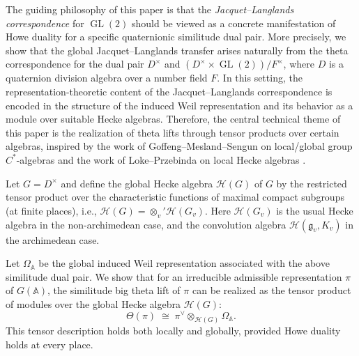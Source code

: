 \documentclass[11pt]{article}
\theoremstyle{plain}
\theoremstyle{remark}
\theoremstyle{definition}
\DeclareMathOperator{\GL}{GL}
\begin{document}
The guiding philosophy of this paper is that the \emph{Jacquet--Langlands correspondence} \cite{JL70} for $\GL(2)$ should be viewed as a concrete manifestation of Howe duality for a specific quaternionic similitude dual pair.
More precisely, we show that the global Jacquet--Langlands transfer arises naturally from the theta correspondence for the dual pair $D^{\times}$ and $(D^{\times}\times \GL(2))/F^{\times}$,
where $D$ is a quaternion division algebra over a number field $F$.
In this setting, the representation-theoretic content of the Jacquet--Langlands correspondence is encoded in the structure of the induced Weil representation and its behavior as a module over suitable Hecke algebras.
Therefore, the central technical theme of this paper is the realization of theta lifts through tensor products over certain algebras, inspired by the work of Goffeng--Mesland--Sengun on local/global group $C^*$-algebras \cite{GMS2024} and the work of Loke--Przebinda on local Hecke algebras \cite{LokePrze2024}.

Let $G=D^{\times}$ and define the global Hecke algebra $\mathcal{H}(G)$ of $G$ by the restricted tensor product over the characteristic functions of maximal compact subgroups (at finite places), i.e.,
$\mathcal{H}(G)=\otimes_v{}' \mathcal{H}(G_v)$.
Here $\mathcal{H}(G_v)$ is the usual Hecke algebra in the non-archimedean case, and the convolution algebra $\mathcal{H}(\mathfrak{g}_v,K_v)$ in the archimedean case.

Let $\Omega_{\mathbb{A}}$ be the global induced Weil representation associated with the above similitude dual pair.
We show that for an irreducible admissible representation $\pi$ of $G(\mathbb{A})$, the similitude big theta lift of $\pi$ can be realized as the tensor product of modules over the global Hecke algebra $\mathcal{H}(G)$:
\[
\Theta(\pi) \;\cong\; \pi^{\vee} \otimes_{\mathcal{H}(G)} \Omega_{\mathbb{A}}.
\]
This tensor description holds both locally and globally, provided Howe duality holds at every place.
\end{document}
